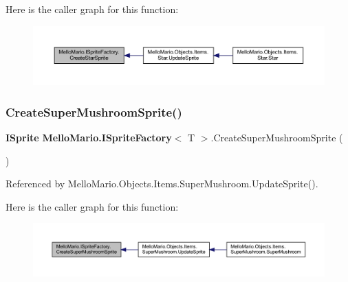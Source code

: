 Here is the caller graph for this function\+:
\nopagebreak
\begin{figure}[H]
\begin{center}
\leavevmode
\includegraphics[width=350pt]{interfaceMelloMario_1_1ISpriteFactory_ae94806cb98922cd925588620558de467_icgraph}
\end{center}
\end{figure}
\mbox{\label{interfaceMelloMario_1_1ISpriteFactory_a8447174f865d9f67385fda09260e3dfb}} 
\subsubsection{Create\+Super\+Mushroom\+Sprite()}
{\footnotesize\ttfamily \textbf{ I\+Sprite} \textbf{ Mello\+Mario.\+I\+Sprite\+Factory}$<$ T $>$.Create\+Super\+Mushroom\+Sprite (\begin{DoxyParamCaption}{ }\end{DoxyParamCaption})}



Referenced by Mello\+Mario.\+Objects.\+Items.\+Super\+Mushroom.\+Update\+Sprite().

Here is the caller graph for this function\+:
\nopagebreak
\begin{figure}[H]
\begin{center}
\leavevmode
\includegraphics[width=350pt]{interfaceMelloMario_1_1ISpriteFactory_a8447174f865d9f67385fda09260e3dfb_icgraph}
\end{center}
\end{figure}
\mbox{\label{interfaceMelloMario_1_1ISpriteFactory_a240c908f42b48cd00a57ab07b52d8488}} 
